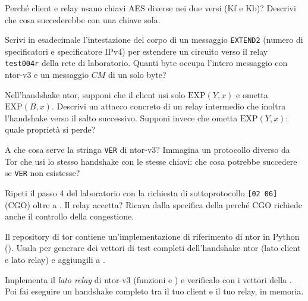 \begin{esercizio}[1]\label{es:09-direzioni}
Perché client e relay usano chiavi AES diverse nei due versi (Kf e Kb)? Descrivi che cosa succederebbe con una chiave sola.
\end{esercizio}

\begin{esercizio}[2]\label{es:09-extend2}
Scrivi in esadecimale l'intestazione del corpo di un messaggio \texttt{EXTEND2} (numero di specificatori e specificatore IPv4) per estendere un circuito verso il relay \texttt{test004r} della rete di laboratorio. Quanti byte occupa l'intero messaggio con ntor-v3 e un messaggio $CM$ di un solo byte?
\end{esercizio}

\begin{esercizio}[2]\label{es:09-ds}
Nell'handshake ntor, supponi che il client usi solo $\mathrm{EXP}(Y, x)$ e ometta $\mathrm{EXP}(B, x)$. Descrivi un attacco concreto di un relay intermedio che inoltra l'handshake verso il salto successivo. Supponi invece che ometta $\mathrm{EXP}(Y, x)$: quale proprietà si perde?
\end{esercizio}

\begin{esercizio}[2]\label{es:09-ver}
A che cosa serve la stringa \texttt{VER} di ntor-v3? Immagina un protocollo diverso da Tor che usi lo stesso handshake con le stesse chiavi: che cosa potrebbe succedere se \texttt{VER} non esistesse?
\end{esercizio}

\begin{esercizio}[2]\label{es:09-cc}
Ripeti il passo 4 del laboratorio con la richiesta di sottoprotocollo \texttt{[02 06]} (CGO) oltre a . Il relay accetta? Ricava dalla specifica della  perché CGO richiede anche il controllo della congestione.
\end{esercizio}

\begin{esercizio}[3]\label{es:09-ntor-ref}
Il repository di tor contiene un'implementazione di riferimento di ntor in Python (). Usala per generare dei vettori di test completi dell'handshake ntor (lato client e lato relay) e aggiungili a .
\end{esercizio}

\begin{esercizio}[3]\label{es:09-relay}
Implementa il \emph{lato relay} di ntor-v3 (funzioni  e ) e verificalo con i vettori della . Poi fai eseguire un handshake completo tra il tuo client e il tuo relay, in memoria.
\end{esercizio}

